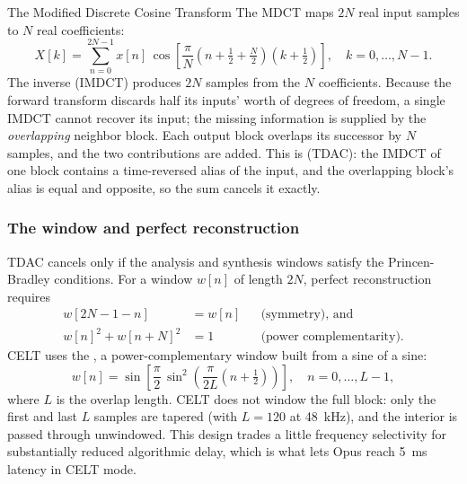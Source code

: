 \begin{concept}{The Modified Discrete Cosine Transform}
  The MDCT maps $2N$ real input samples to $N$ real coefficients:
  \begin{equation}\label{eq:mdct}
    X[k] = \sum_{n=0}^{2N-1} x[n]\,
      \cos\!\left[\frac{\pi}{N}\left(n + \tfrac{1}{2} + \tfrac{N}{2}\right)
                  \left(k + \tfrac{1}{2}\right)\right],
    \quad k = 0,\dots,N-1.
  \end{equation}
  The inverse (IMDCT) produces $2N$ samples from the $N$ coefficients. Because
  the forward transform discards half its inputs' worth of degrees of freedom,
  a single IMDCT cannot recover its input; the missing information is supplied by
  the \emph{overlapping} neighbor block. Each output block overlaps its successor
  by $N$ samples, and the two contributions are added. This is
   (TDAC): the IMDCT of one block
  contains a time-reversed alias of the input, and the overlapping block's alias
  is equal and opposite, so the sum cancels it exactly.
\end{concept}

\subsubsection{The window and perfect reconstruction}

TDAC cancels only if the analysis and synthesis windows satisfy the
Princen-Bradley conditions. For a window $w[n]$ of length $2N$, perfect
reconstruction requires
\begin{align}
  \label{eq:pr_symmetry}
  w[2N - 1 - n] &= w[n] && \text{(symmetry), and}\\
  \label{eq:pr_power}
  w[n]^2 + w[n + N]^2 &= 1 && \text{(power complementarity).}
\end{align}
CELT uses the , a power-complementary window built from a
sine of a sine:
\begin{equation}\label{eq:vorbis_window}
  w[n] = \sin\!\left[\frac{\pi}{2}\,
    \sin^2\!\left(\frac{\pi}{2L}\left(n + \tfrac{1}{2}\right)\right)\right],
  \quad n = 0,\dots,L-1,
\end{equation}
where $L$ is the overlap length. CELT does not window the full block: only the
first and last $L$ samples are tapered (with $L = 120$ at 48~kHz), and the
interior is passed through unwindowed. This  design trades a
little frequency selectivity for substantially reduced algorithmic delay, which
is what lets Opus reach 5~ms latency in CELT mode.


